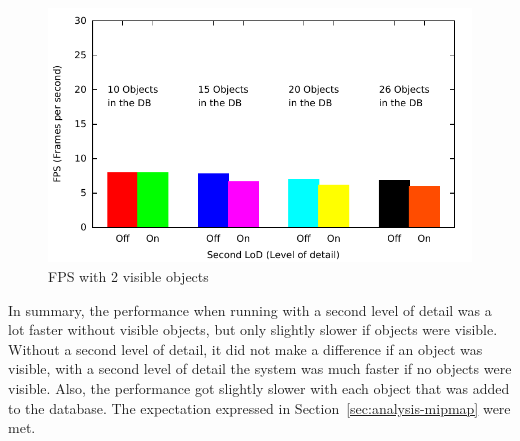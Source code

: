 \begin{figure}[H]
  \includegraphics[width=1.0\textwidth]{images/fps-2-objects.pdf}
  \caption{FPS with 2 visible objects}
\end{figure}

In summary, the performance when running with a second level of detail was a lot faster without visible objects, but only slightly slower if objects were visible. Without a second level of detail, it did not make a difference if an object was visible, with a second level of detail the system was much faster if no objects were visible. Also, the performance got slightly slower with each object that was added to the database. The expectation expressed in Section~\ref{sec:analysis-mipmap} were met.


